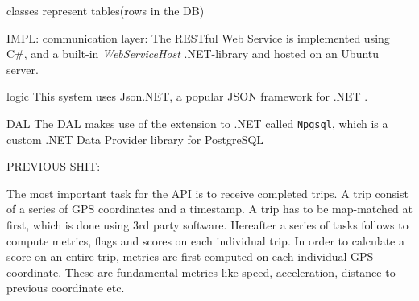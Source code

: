 classes represent tables(rows in the DB)





IMPL:
communication layer:
The RESTful Web Service is implemented using C\#, and a built-in \textit{WebServiceHost} .NET-library and hosted on an Ubuntu server.


logic
This system uses Json.NET, a popular JSON framework for .NET \citep{json_dot_net}. 

DAL
The DAL makes use of the extension to .NET called \texttt{Npgsql}\citep{npgsql}, which is a custom .NET Data Provider library for PostgreSQL


PREVIOUS SHIT:

The most important task for the API is to receive completed trips. A trip consist of a series of GPS coordinates and a timestamp. A trip has to be map-matched at first, which is done using 3rd party software\cite{trackmatch}. Hereafter a series of tasks follows to compute metrics, flags and scores on each individual trip\cite{sw9_report}. In order to calculate a score on an entire trip, metrics are first computed on each individual GPS-coordinate. These are fundamental metrics like speed, acceleration, distance to previous coordinate etc. 

